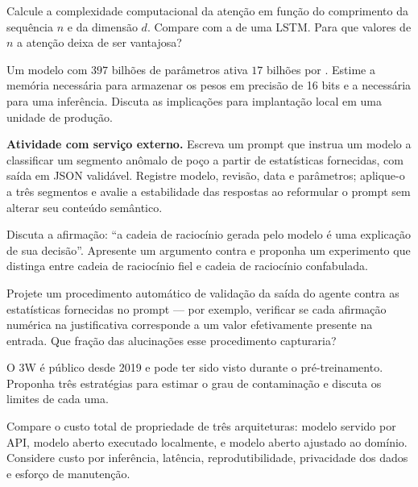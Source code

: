 \begin{exercicios}
\item Calcule a complexidade computacional da atenção em função do comprimento da
      sequência $n$ e da dimensão $d$. Compare com a de uma LSTM. Para que valores de $n$
      a atenção deixa de ser vantajosa?

\item Um modelo com $397$ bilhões de parâmetros ativa $17$ bilhões por .
      Estime a memória necessária para armazenar os pesos em precisão de 16 bits e a
      necessária para uma inferência. Discuta as implicações para implantação local em
      uma unidade de produção.

\item \textbf{Atividade com serviço externo.} Escreva um prompt que instrua um modelo a
      classificar um segmento anômalo de poço a partir de estatísticas fornecidas, com
      saída em JSON validável. Registre modelo, revisão, data e parâmetros; aplique-o a
      três segmentos e avalie a estabilidade das respostas ao reformular o prompt sem
      alterar seu conteúdo semântico.

\item Discuta a afirmação: ``a cadeia de raciocínio gerada pelo modelo é uma explicação
      de sua decisão''. Apresente um argumento contra e proponha um experimento que
      distinga entre cadeia de raciocínio fiel e cadeia de raciocínio confabulada.

\item Projete um procedimento automático de validação da saída do agente contra as
      estatísticas fornecidas no prompt --- por exemplo, verificar se cada afirmação
      numérica na justificativa corresponde a um valor efetivamente presente na entrada.
      Que fração das alucinações esse procedimento capturaria?

\item O 3W é público desde 2019 e pode ter sido visto durante o pré-treinamento. Proponha
      três estratégias para estimar o grau de contaminação e discuta os limites de cada
      uma.

\item Compare o custo total de propriedade de três arquiteturas: modelo servido por API,
      modelo aberto executado localmente, e modelo aberto ajustado ao domínio. Considere
      custo por inferência, latência, reprodutibilidade, privacidade dos dados e esforço
      de manutenção.
\end{exercicios}


